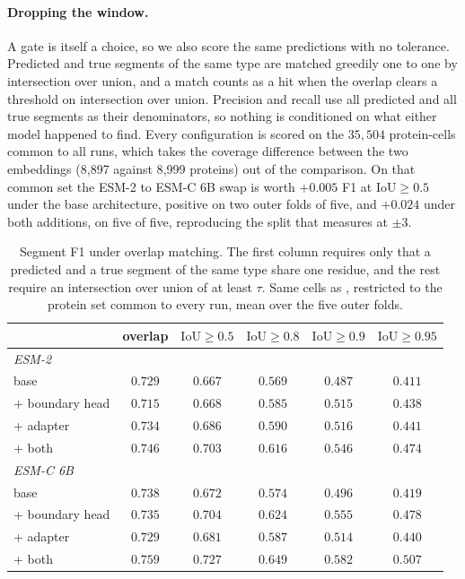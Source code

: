 \documentclass{article}
\begin{document}
\paragraph{Dropping the window.} A gate is itself a choice, so we also score the same predictions
with no tolerance. Predicted and true segments of the same type are matched greedily one to one by
intersection over union, and a match counts as a hit when the overlap clears a threshold on intersection over union.
Precision and recall use all predicted and all true segments as their denominators, so nothing is
conditioned on what either model happened to find. Every configuration is scored on the
$35{,}504$ protein-cells common to all runs, which takes the coverage difference between the two
embeddings (8{,}897 against 8{,}999 proteins) out of the comparison. On that common set the ESM-2
to ESM-C 6B swap is worth $+0.005$ F1 at $\mathrm{IoU}\ge0.5$ under the base architecture, positive on two outer folds of
five, and $+0.024$ under both additions, on five of five, reproducing the split that
 measures at $\pm3$.

\begin{table}[h]
\centering
\caption{Segment F1 under overlap matching. The first column requires only that a predicted and a
true segment of the same type share one residue, and the rest require an intersection over union of at
least $\tau$. Same cells as , restricted to the protein set common to every
run, mean over the five outer folds.}
\label{tab:iou}
\small
\begin{tabular}{lccccc}
\toprule
& overlap & $\mathrm{IoU}\ge0.5$ & $\mathrm{IoU}\ge0.8$ & $\mathrm{IoU}\ge0.9$ & $\mathrm{IoU}\ge0.95$ \\
\midrule
\multicolumn{6}{l}{\emph{ESM-2}}\\
base & $0.729$ & $0.667$ & $0.569$ & $0.487$ & $0.411$ \\
\quad + boundary head & $0.715$ & $0.668$ & $0.585$ & $0.515$ & $0.438$ \\
\quad + adapter & $0.734$ & $0.686$ & $0.590$ & $0.516$ & $0.441$ \\
\quad + both & $0.746$ & $0.703$ & $0.616$ & $0.546$ & $0.474$ \\
\midrule
\multicolumn{6}{l}{\emph{ESM-C 6B}}\\
base & $0.738$ & $0.672$ & $0.574$ & $0.496$ & $0.419$ \\
\quad + boundary head & $0.735$ & $0.704$ & $0.624$ & $0.555$ & $0.478$ \\
\quad + adapter & $0.729$ & $0.681$ & $0.587$ & $0.514$ & $0.440$ \\
\quad + both & $0.759$ & $0.727$ & $0.649$ & $0.582$ & $0.507$ \\
\bottomrule
\end{tabular}
\end{table}
\end{document}

